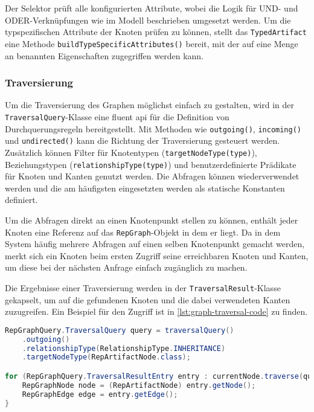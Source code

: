 Der Selektor prüft alle konfigurierten Attribute, wobei die Logik für UND- und ODER-Verknüpfungen wie im Modell beschrieben umgesetzt werden.
Um die typspezifischen Attribute der Knoten prüfen zu können, stellt das \texttt{TypedArtifact} eine Methode \texttt{buildTypeSpecificAttributes()} bereit, mit der auf eine Menge an benannten Eigenschaften zugegriffen werden kann.

\subsubsection{Traversierung}

Um die Traversierung des Graphen möglichst einfach zu gestalten, wird in der \texttt{TraversalQuery}-Klasse eine fluent \acrshort{api} für die Definition von Durchquerungsregeln bereitgestellt.
Mit Methoden wie \texttt{outgoing()}, \texttt{incoming()} und \texttt{undirected()} kann die Richtung der Traversierung gesteuert werden.
Zusätzlich können Filter für Knotentypen (\texttt{targetNodeType(type)}), Beziehungstypen (\texttt{relationshipType(type)}) und benutzerdefinierte Prädikate für Knoten und Kanten genutzt werden.
Die Abfragen können wiederverwendet werden und die am häufigsten eingesetzten werden als statische Konstanten definiert.

Um die Abfragen direkt an einen Knotenpunkt stellen zu können, enthält jeder Knoten eine Referenz auf das \texttt{RepGraph}-Objekt in dem er liegt.
Da in dem System häufig mehrere Abfragen auf einen selben Knotenpunkt gemacht werden, merkt sich ein Knoten beim ersten Zugriff seine erreichbaren Knoten und Kanten, um diese bei der nächsten Anfrage einfach zugänglich zu machen.

Die Ergebnisse einer Traversierung werden in der \texttt{TraversalResult}-Klasse gekapselt, um auf die gefundenen Knoten und die dabei verwendeten Kanten zuzugreifen.
Ein Beispiel für den Zugriff ist in \autoref{lst:graph-traversal-code} zu finden.

\begin{lstlisting}[language=Java,caption={Durchquerungsabfragen in Java},label=lst:graph-traversal-code,basicstyle=\ttfamily\scriptsize]
RepGraphQuery.TraversalQuery query = traversalQuery()
    .outgoing()
    .relationshipType(RelationshipType.INHERITANCE)
    .targetNodeType(RepArtifactNode.class);

for (RepGraphQuery.TraversalResultEntry entry : currentNode.traverse(query)) {
    RepGraphNode node = (RepArtifactNode) entry.getNode();
    RepGraphEdge edge = entry.getEdge();
}
\end{lstlisting}

